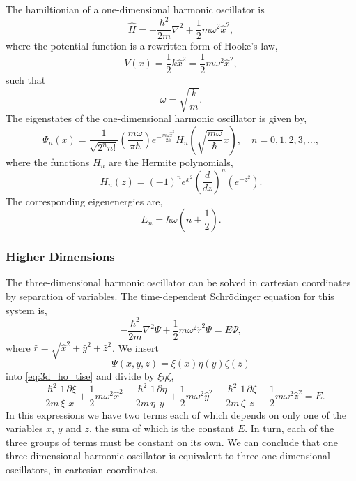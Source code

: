 The hamiltionian of a one-dimensional harmonic oscillator is
\begin{equation}
    \hat{H} = -\frac{\hbar^2}{2m} \nabla^2 + \frac{1}{2}m\omega^2\hat{x}^2,
\end{equation}
where the potential function is a rewritten form of Hooke's law,
\begin{equation}
    V(x) = \frac{1}{2}k \hat{x}^2 = \frac{1}{2}m\omega^2\hat{x}^2,
\end{equation}
such that 
\begin{equation*}
    \omega = \sqrt{\frac{k}{m}}.
\end{equation*}
The eigenstates of the one-dimensional harmonic oscillator is given by,
\begin{equation}
    \Psi_n(x) =
        \frac{1}{\sqrt{2^n n!}} 
        \left(\frac{m\omega}{\pi\hbar} \right) 
        e^{-\frac{m\omega\hat{x}^2}{2\hbar}}
        H_n\left(\sqrt{\frac{m\omega}{\hbar}} x \right),
        \quad n=0,1,2,3,\dots,
\end{equation}
where the functions $H_n$ are the Hermite polynomials,
\begin{equation}
    H_n(z) = 
    (-1)^n e^{x^2}
    \left(\frac{d}{dz} \right)^n
    \left(e^{-z^2} \right).
\end{equation}
The corresponding eigenenergies are,
\begin{equation}
    E_n = \hbar\omega\left(n + \frac{1}{2} \right).
\end{equation}

\subsubsection{Higher Dimensions}

The three-dimensional harmonic oscillator can be solved in cartesian 
coordinates by separation of variables. The time-dependent Schrödinger
equation for this system is,
\begin{equation}
    \label{eq:3d_ho_tise}
    -\frac{\hbar^2}{2m} \nabla^2\Psi
    +\frac{1}{2}m\omega^2\hat{r}^2\Psi = E\Psi,
\end{equation}
where $\hat{r} = \sqrt{\hat{x}^2 + \hat{y}^2 + \hat{z}^2}$. We insert
\begin{equation*}
    \Psi(x, y, z) = \xi(x)\eta(y)\zeta(z)
\end{equation*}
into \autoref{eq:3d_ho_tise} and divide by $\xi\eta\zeta$,
\begin{equation}
    -\frac{\hbar^2}{2m}\frac{1}{\xi}\frac{\partial \xi}{x}
    +\frac{1}{2}m\omega^2\hat{x}^2
    -\frac{\hbar^2}{2m}\frac{1}{\eta}\frac{\partial \eta}{y}
    +\frac{1}{2}m\omega^2\hat{y}^2
    -\frac{\hbar^2}{2m}\frac{1}{\zeta}\frac{\partial \zeta}{z}
    +\frac{1}{2}m\omega^2\hat{z}^2 = E.
\end{equation}
In this expressions we have two terms each of which depends on 
only one of the variables $x$, $y$ and $z$, the sum of which is 
the constant $E$. In turn, each of the three groups of terms must be constant 
on its own. We can conclude that one three-dimensional harmonic 
oscillator is equivalent to three one-dimensional 
oscillators, in cartesian coordinates.

